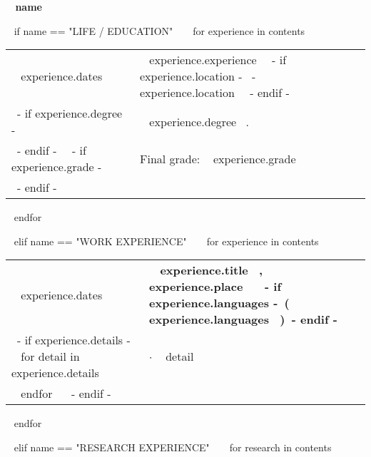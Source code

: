 \medskip

\selectfont

\hspace{-20mm}\colorbox{maincolor}{\begin{minipage}[t][8mm][c]{75mm}
\hspace{20mm}\bfseries \color{white}  ~{{ name }}~
\end{minipage}}
\vspace{6mm}

\begin{minipage}{\textwidth}

~{ if name == "LIFE / EDUCATION" }~
  ~{ for experience in contents }~
    \begin{tabular}{ @{} p{32mm} l @{} }
    {\small ~{{ experience.dates }}~} & {\small ~{{ experience.experience }}~}~{- if experience.location -}~ \small \hspace{1mm}- ~{{ experience.location }}~~{- endif -}~\\
    ~{- if experience.degree -}~
      & \small ~{{ experience.degree }}~.\\
    ~{- endif -}~
    ~{- if experience.grade -}~
      & \small \color{maingrey} Final grade: ~{{ experience.grade }}~\\
    ~{- endif -}~
    \end{tabular}
    \vspace{1mm}
  ~{ endfor }~
  \vspace{2mm}

~{ elif name == "WORK EXPERIENCE" }~
  ~{ for experience in contents }~
    \begin{tabular}{ @{} p{32mm} p{135mm} @{} }
    \small ~{{ experience.dates }}~ & \bf\small ~{{ experience.title }}~, ~{{ experience.place }}~ ~{- if experience.languages -}~\small\hspace{1mm}\bf\color{maincolor}(~{{ experience.languages }}~)~{- endif -}~\\
    ~{- if experience.details -}~
      ~{ for detail in experience.details }~
        & $\cdot$ \small ~{{ detail }}~ \\
      ~{ endfor }~
    ~{- endif -}~
    \end{tabular}
    \vspace{2mm}
  ~{ endfor }~
  \vspace{20mm}

~{ elif name == "RESEARCH EXPERIENCE" }~
  ~{ for research in contents }~
    \begin{tabular}{ @{} p{32mm} p{135mm} @{} }


\end{tabular}
\end{minipage}
